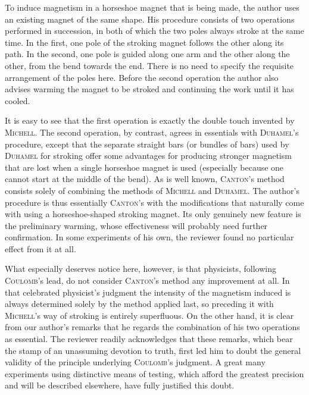 To induce magnetism in a horseshoe magnet that is being made, the author uses an existing magnet of the same shape. His procedure consists of two operations performed in succession, in both of which the two poles always stroke at the same time. In the first, one pole of the stroking magnet follows the other along its path. In the second, one pole is guided along one arm and the other along the other, from the bend towards the end. There is no need to specify the requisite arrangement of the poles here. Before the second operation the author also advises warming the magnet to be stroked and continuing the work until it has cooled.

It is easy to see that the first operation is exactly the double touch invented by \textsc{Michell}. The second operation, by contrast, agrees in essentials with \textsc{Duhamel}’s procedure, except that the separate straight bars (or bundles of bars) used by \textsc{Duhamel} for stroking offer some advantages for producing stronger magnetism that are lost when a single horseshoe magnet is used (especially because one cannot start at the middle of the bend). As is well known, \textsc{Canton}’s method consists solely of combining the methods of \textsc{Michell} and \textsc{Duhamel}. The author’s procedure is thus essentially \textsc{Canton}’s with the modifications that naturally come with using a horseshoe-shaped stroking magnet. Its only genuinely new feature is the preliminary warming, whose effectiveness will probably need further confirmation. In some experiments of his own, the reviewer found no particular effect from it at all.

What especially deserves notice here, however, is that physicists, following \textsc{Coulomb}’s lead, do not consider \textsc{Canton}’s method any improvement at all. In that celebrated physicist’s judgment the intensity of the magnetism induced is always determined solely by the method applied last, so preceding it with \textsc{Michell}’s way of stroking is entirely superfluous. On the other hand, it is clear from our author’s remarks that he regards the combination of his two operations as essential. The reviewer readily acknowledges that these remarks, which bear the stamp of an unassuming devotion to truth, first led him to doubt the general validity of the principle underlying \textsc{Coulomb}’s judgment. A great many experiments using distinctive means of testing, which afford the greatest precision and will be described elsewhere, have fully justified this doubt.

